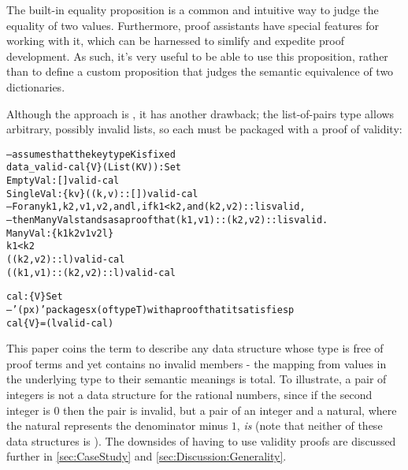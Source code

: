 The built-in equality proposition is a common and intuitive way to judge the equality of two values.
%
Furthermore, proof assistants have special features for working with it, which can be harnessed to simlify and expedite proof development.
%
As such, it's very useful to be able to use this proposition, rather than to define a custom proposition that judges the semantic equivalence of two dictionaries.

Although the \cal{} approach is \extensional, it has another drawback; the list-of-pairs type allows arbitrary, possibly invalid lists, so each \cal{} must be packaged with a proof of validity:
\begin{alltt}
  -- assumes that the key type K is fixed
  data \_valid-cal \altFAll\{V\} (List (K \altTimes V)) : Set
    EmptyVal  : [] valid-cal
    SingleVal : \altFAll\{k v\} \altRArr ((k , v) :: []) valid-cal
    -- For any k1, k2, v1, v2, and l, if k1 < k2, and (k2 , v2) :: l is valid,
    -- then ManyVal stands as a proof that (k1 , v1) :: (k2 , v2) :: l is valid.
    ManyVal   : \altFAll\{k1 k2 v1 v2 l\} \altRArr
                  k1 < k2 \altRArr
                  ((k2 , v2) :: l) valid-cal \altRArr
                  ((k1 , v1) :: (k2 , v2) :: l) valid-cal

  cal : \altFAll\{V\} \altRArr Set
  -- '\altSum[ x \altIn T ] (p x)' packages x (of type T) with a proof that it satisfies p
  cal \{V\} =  (l valid-cal)
\end{alltt}

This paper coins the term \firstUseGoal{\semanticallyTotal} to describe any data structure whose type is free of proof terms and yet contains no invalid members -
%
\ie{} the mapping from values in the underlying type to their semantic meanings is total.
%
To illustrate, a pair of integers is not a \semanticallyTotal{} data structure for the rational numbers, since if the second integer is $0$ then the pair is invalid,
%
but a pair of an integer and a natural, where the natural represents the denominator minus $1$, \emph{is} \semanticallyTotal{} (note that neither of these data structures is \extensional).
%
The downsides of having to use validity proofs are discussed further in \autoref{sec:CaseStudy} and \autoref{sec:Discussion:Generality}.

\parahead{\Fpfs}

